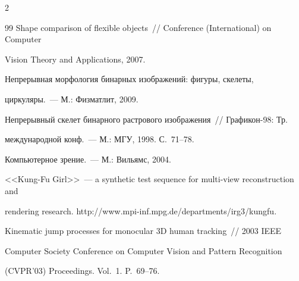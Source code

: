\begin{multicols}{2}
{{\begin{thebibliography}{99}
Shape comparison of flexible objects~//  Conference (International) on Computer 

Vision Theory and Applications, 2007.





Непрерывная морфология бинарных изображений: фигуры, скелеты, 

циркуляры.~--- М.: Физматлит, 2009.





Непрерывный скелет бинарного раст\-ро\-во\-го изображения~// Графикон-98: Тр. 

международной конф.~--- М.: МГУ, 1998. С.~71--78. 





Компьютерное зрение.~--- М.: Вильямс, 2004.




<<Kung-Fu Girl>>~--- a synthetic test sequence for multi-view reconstruction and 

rendering research. {\sf http://www.\linebreak mpi-inf.mpg.de/departments/irg3/kungfu}.





\label{end\stat}





Kinematic jump processes for monocular 3D human tracking~// 2003 IEEE 

Computer Society Conference on Computer Vision and Pattern Recognition 

(CVPR'03) Proceedings. Vol.~1. P.~69--76.



 \end{thebibliography}

}

}





\end{multicols}

